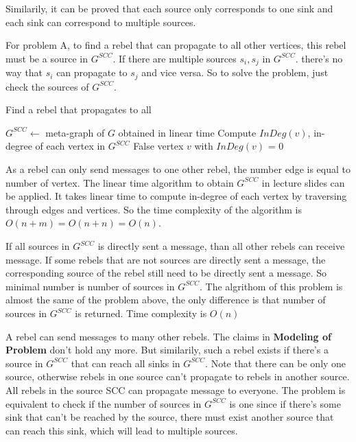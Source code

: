 \documentclass[12pt,a4paper]{article}
\newcommand{\question}[1]{\bigskip\noindent{\textbf{Q{#1} solution}}}
\begin{document}
Similarily, it can be proved that each source only corresponds to one sink and each sink can correspond to multiple sources.

For problem A, to find a rebel that can propagate to all other vertices, this rebel must be a source in $G^{SCC}$. If there are multiple sources $s_i,s_j$ in $G^{SCC}$. there's no way that $s_i$ can propagate to $s_j$ and vice versa. So to solve the problem, just check the sources of $G^{SCC}$.  


\begin{algorithm}
\caption{Find a rebel that propagates to all}\label{alg:q24A}
\begin{algorithmic}
    \State $G^{SCC} \gets$ meta-graph of $G$ obtained in linear time
    \State Compute $InDeg(v)$, in-degree of each vertex in $G^{SCC}$
      \State \Return False
    \Else
      \State \Return vertex $v$ with $InDeg(v)$ = 0
    \EndIf
  \EndFunction
\end{algorithmic}
\end{algorithm}

As a rebel can only send messages to one other rebel, the number edge is equal to number of vertex. The linear time algorithm to obtain $G^{SCC}$ in lecture slides can be applied. It takes linear time to compute in-degree of each vertex by traversing through edges and vertices. So the time complexity of the algorithm is $O(n + m) = O(n + n) = O(n)$.

\question{24.B}

If all sources in $G^{SCC}$ is directly sent a message, than all other rebels can receive message. If some rebels that are not sources are directly sent a message, the corresponding source of the rebel still need to be directly sent a message. So minimal number is number of sources in $G^{SCC}$. The algrithom of this problem is almost the same of the problem above, the only difference is that number of sources in $G^{SCC}$ is returned. Time complexity is $O(n)$

\question{24.C}

A rebel can send messages to many other rebels. The claims in {\bf Modeling of Problem} don't hold any more. But similarily, such a rebel exists if there's a source in $G^{SCC}$ that can reach all sinks in $G^{SCC}$. Note that there can be only one source, otherwise rebels in one source can't propagate to rebels in another source. All rebels in the source SCC can propagate message to everyone. The problem is equivalent to check if the number of sources in $G^{SCC}$ is one since if there's some sink that can't be reached by the source, there must exist another source that can reach this sink, which will lead to multiple sources.
\end{document}
